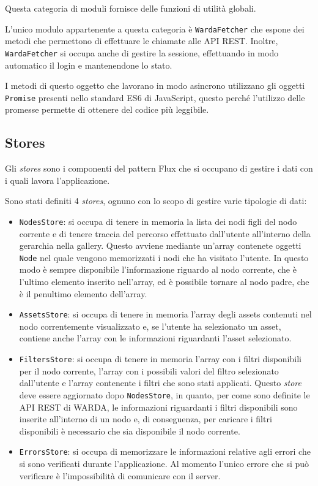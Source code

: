 Questa categoria di moduli fornisce delle funzioni di utilità globali.

L'unico modulo appartenente a questa categoria è \texttt{WardaFetcher} che espone dei metodi che permettono di effettuare le chiamate alle API REST.
Inoltre, \texttt{WardaFetcher} si occupa anche di gestire la sessione, effettuando in modo automatico il login e mantenendone lo stato.

I metodi di questo oggetto che lavorano in modo asincrono utilizzano gli oggetti \texttt{Promise} presenti nello standard ES6 di JavaScript, questo perché l'utilizzo delle promesse permette di ottenere del codice più leggibile.

\subsection{Stores}

Gli \textit{stores} sono i componenti del pattern Flux che si occupano di gestire i dati con i quali lavora l'applicazione. 

Sono stati definiti 4 \textit{stores}, ognuno con lo scopo di gestire varie tipologie di dati:
\begin{itemize}
\item \texttt{NodesStore}: si occupa di tenere in memoria la lista dei nodi figli del nodo corrente e di tenere traccia del percorso effettuato dall'utente all'interno della gerarchia nella gallery. Questo avviene mediante un'array contenete oggetti \texttt{Node} nel quale vengono memorizzati i nodi che ha visitato l'utente. In questo modo è sempre disponibile l'informazione riguardo al nodo corrente, che è l'ultimo elemento inserito nell'array, ed è possibile tornare al nodo padre, che è il penultimo elemento dell'array.
\item \texttt{AssetsStore}: si occupa di tenere in memoria l'array degli assets contenuti nel nodo correntemente visualizzato e, se l'utente ha selezionato un asset, contiene anche l'array con le informazioni riguardanti l'asset selezionato.
\item \texttt{FiltersStore}: si occupa di tenere in memoria l'array con i filtri disponibili per il nodo corrente, l'array con i possibili valori del filtro selezionato dall'utente e l'array contenente i filtri che sono stati applicati. Questo \textit{store} deve essere aggiornato dopo \texttt{NodesStore}, in quanto, per come sono definite le API REST di WARDA, le informazioni riguardanti i filtri disponibili sono inserite all'interno di un nodo e, di conseguenza, per caricare i filtri disponibili è necessario che sia disponibile il nodo corrente.
\item \texttt{ErrorsStore}: si occupa di memorizzare le informazioni relative agli errori che si sono verificati durante l'applicazione. Al momento l'unico errore che si può verificare è l'impossibilità di comunicare con il server.
\end{itemize}

